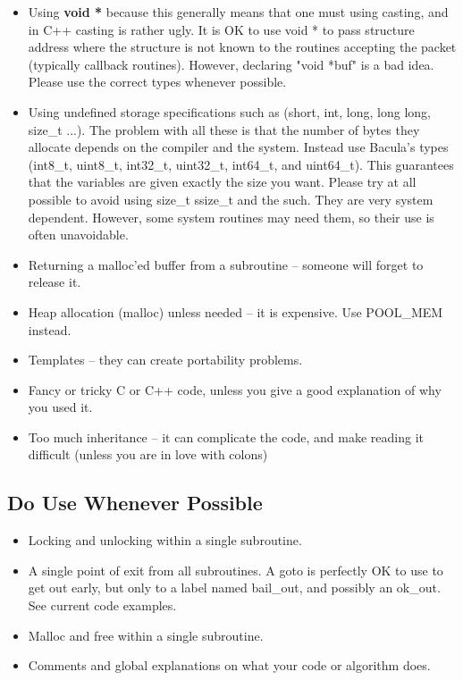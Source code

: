 \begin{itemize}
\item Using {\bf void *} because this generally means that one must
   using casting, and in C++ casting is rather ugly.  It is OK to use
   void * to pass structure address where the structure is not known  
   to the routines accepting the packet (typically callback routines).
   However, declaring "void *buf" is a bad idea.  Please use the
   correct types whenever possible.

\item Using undefined storage specifications such as (short, int, long,
   long long, size\_t ...).  The problem with all these is that the number of bytes
   they allocate depends on the compiler and the system.  Instead use
   Bacula's types (int8\_t, uint8\_t, int32\_t, uint32\_t, int64\_t, and 
   uint64\_t).  This guarantees that the variables are given exactly the
   size you want. Please try at all possible to avoid using size\_t ssize\_t
   and the such. They are very system dependent.  However, some system
   routines may need them, so their use is often unavoidable.

\item Returning a malloc'ed buffer from a subroutine --  someone will forget
   to release it. 

\item Heap allocation (malloc) unless needed -- it is expensive. Use
      POOL\_MEM instead.

\item Templates -- they can create portability problems. 

\item Fancy or tricky C or C++ code, unless you give a  good explanation of
   why you used it. 

\item Too much inheritance -- it can complicate the code,  and make reading it
   difficult (unless you are in love  with colons) 

\end{itemize}

\subsection{Do Use Whenever Possible}

\begin{itemize}
\item Locking and unlocking within a single subroutine.  

\item A single point of exit from all subroutines. A goto is 
     perfectly OK to use to get out early, but only to a label
     named bail\_out, and possibly an ok\_out.  See current code
     examples.

\item Malloc and free within a single subroutine.  

\item Comments and global explanations on what your code or  algorithm does. 

\end{itemize}

